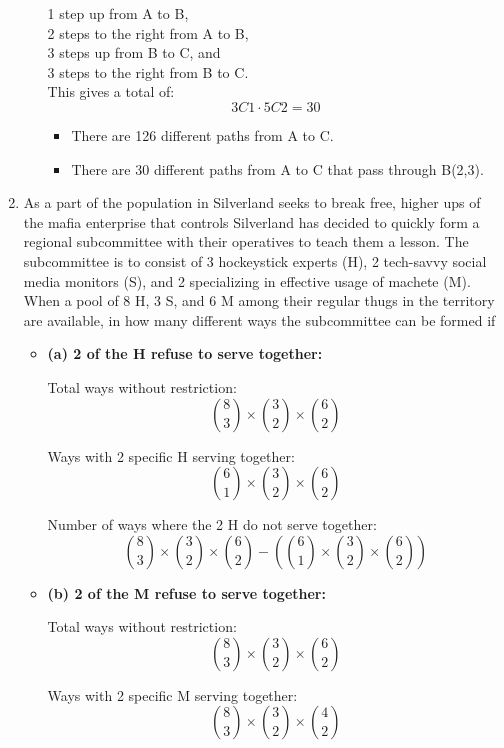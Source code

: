 \documentclass{book}
\begin{document}
\begin{enumerate}
\begin{itemize}
		            1 step up from A to B,\\
		            2 steps to the right from A to B,\\
		            3 steps up from B to C, and\\
		            3 steps to the right from B to C.\\
		            This gives a total of:
		            \[
			            3C1 \cdot 5C2 = 30
		            \]
		            \begin{itemize}
			            \item  There are 126 different paths from A to C.
			            \item There are 30 different paths from A to C that pass through B(2,3).
		            \end{itemize}
	      \end{itemize}
	\item As a part of the population in Silverland seeks to break free,
	      higher ups of the mafia enterprise that controls Silverland has
	      decided to quickly form a regional subcommittee with their
	      operatives to teach them a lesson. The subcommittee is to
	      consist of 3 hockeystick experts (H), 2 tech-savvy social media
	      monitors (S), and 2 specializing in effective usage of machete
	      (M). When a pool of 8 H, 3 S, and 6 M among their regular
	      thugs in the territory are available, in how many different
	      ways the subcommittee can be formed if
	      \begin{itemize}
		      \item \textbf{(a) 2 of the H refuse to serve together:}

		            Total ways without restriction:
		            \[ \binom{8}{3} \times \binom{3}{2} \times \binom{6}{2} \]

		            Ways with 2 specific H serving together:
		            \[ \binom{6}{1} \times \binom{3}{2} \times \binom{6}{2} \]

		            Number of ways where the 2 H do not serve together:
		            \[
			            \binom{8}{3} \times \binom{3}{2} \times \binom{6}{2} - \left( \binom{6}{1} \times \binom{3}{2} \times \binom{6}{2} \right)
		            \]
		      \item \textbf{(b) 2 of the M refuse to serve together:}

		            Total ways without restriction:
		            \[ \binom{8}{3} \times \binom{3}{2} \times \binom{6}{2} \]

		            Ways with 2 specific M serving together:
		            \[ \binom{8}{3} \times \binom{3}{2} \times \binom{4}{2} \]


\end{itemize}
\end{enumerate}
\end{document}
